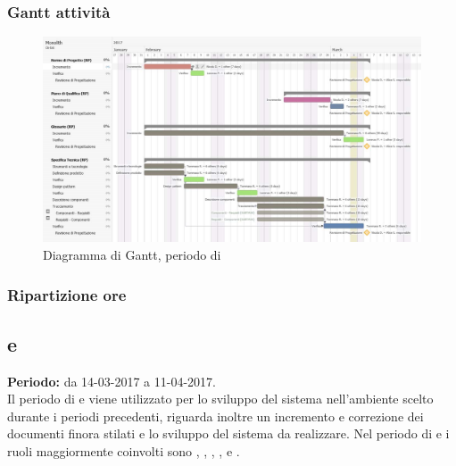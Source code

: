 \subsubsection{Gantt attività}
\begin{figure}[H]
	\centering
	\includegraphics[width=15cm]{gantt/Gantt_RP2.png}
	\caption{Diagramma di Gantt, periodo di \PA{}}
\end{figure}

\subsubsection{Ripartizione ore}
\bgroup
\egroup

\subsection{\PD{} e \Cod{}}
\textbf{Periodo:} da 14-03-2017 a 11-04-2017. \\
Il periodo di \PD{} e \Cod{} viene utilizzato per lo sviluppo del sistema nell'ambiente scelto durante i periodi precedenti, riguarda inoltre un incremento e correzione dei documenti finora stilati e lo sviluppo del sistema da realizzare.
Nel periodo di \PD{} e \Cod{} i ruoli maggiormente coinvolti sono \Programmatore{}, \Progettista{}, \Analista{}, \Responsabile{}, \Amministratore{} e \Verificatore{}.
